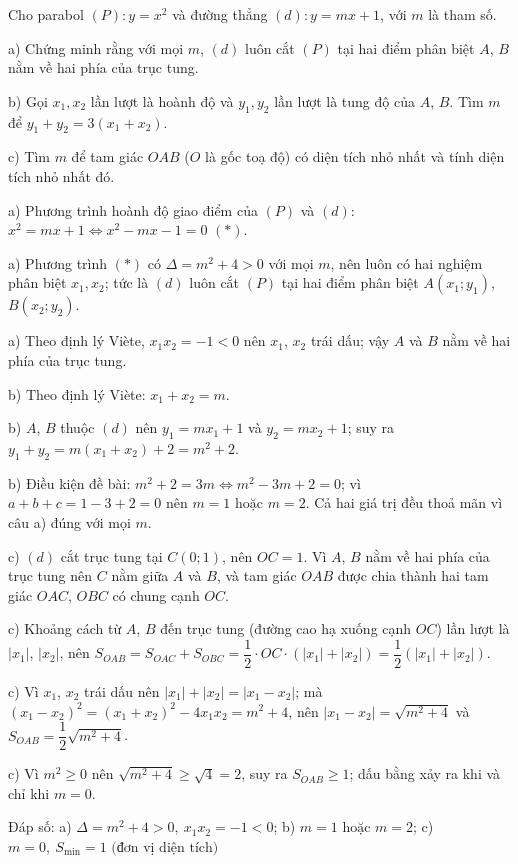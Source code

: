 \begin{problem}[9DS-HSB2-009]
Cho parabol $(P)\colon y = x^2$ và đường thẳng $(d)\colon y = mx + 1$, với $m$ là tham số.

a) Chứng minh rằng với mọi $m$, $(d)$ luôn cắt $(P)$ tại hai điểm phân biệt $A$, $B$ nằm về hai phía của trục tung.

b) Gọi $x_1, x_2$ lần lượt là hoành độ và $y_1, y_2$ lần lượt là tung độ của $A$, $B$. Tìm $m$ để $y_1 + y_2 = 3(x_1 + x_2)$.

c) Tìm $m$ để tam giác $OAB$ ($O$ là gốc toạ độ) có diện tích nhỏ nhất và tính diện tích nhỏ nhất đó.

\begin{solution}
a) Phương trình hoành độ giao điểm của $(P)$ và $(d)$: $x^2 = mx + 1 \Leftrightarrow x^2 - mx - 1 = 0$ $(*)$.

a) Phương trình $(*)$ có $\Delta = m^2 + 4 > 0$ với mọi $m$, nên luôn có hai nghiệm phân biệt $x_1, x_2$; tức là $(d)$ luôn cắt $(P)$ tại hai điểm phân biệt $A(x_1; y_1)$, $B(x_2; y_2)$.

a) Theo định lý Viète, $x_1 x_2 = -1 < 0$ nên $x_1$, $x_2$ trái dấu; vậy $A$ và $B$ nằm về hai phía của trục tung.

b) Theo định lý Viète: $x_1 + x_2 = m$.

b) $A$, $B$ thuộc $(d)$ nên $y_1 = mx_1 + 1$ và $y_2 = mx_2 + 1$; suy ra $y_1 + y_2 = m(x_1 + x_2) + 2 = m^2 + 2$.

b) Điều kiện đề bài: $m^2 + 2 = 3m \Leftrightarrow m^2 - 3m + 2 = 0$; vì $a + b + c = 1 - 3 + 2 = 0$ nên $m = 1$ hoặc $m = 2$. Cả hai giá trị đều thoả mãn vì câu a) đúng với mọi $m$.

c) $(d)$ cắt trục tung tại $C(0; 1)$, nên $OC = 1$. Vì $A$, $B$ nằm về hai phía của trục tung nên $C$ nằm giữa $A$ và $B$, và tam giác $OAB$ được chia thành hai tam giác $OAC$, $OBC$ có chung cạnh $OC$.

c) Khoảng cách từ $A$, $B$ đến trục tung (đường cao hạ xuống cạnh $OC$) lần lượt là $|x_1|$, $|x_2|$, nên $S_{OAB} = S_{OAC} + S_{OBC} = \dfrac{1}{2} \cdot OC \cdot (|x_1| + |x_2|) = \dfrac{1}{2}(|x_1| + |x_2|)$.

c) Vì $x_1$, $x_2$ trái dấu nên $|x_1| + |x_2| = |x_1 - x_2|$; mà $(x_1 - x_2)^2 = (x_1 + x_2)^2 - 4x_1x_2 = m^2 + 4$, nên $|x_1 - x_2| = \sqrt{m^2 + 4}$ và $S_{OAB} = \dfrac{1}{2}\sqrt{m^2 + 4}$.

c) Vì $m^2 \geq 0$ nên $\sqrt{m^2 + 4} \geq \sqrt{4} = 2$, suy ra $S_{OAB} \geq 1$; dấu bằng xảy ra khi và chỉ khi $m = 0$.

Đáp số: a) $\boxed{\Delta = m^2 + 4 > 0,\ x_1 x_2 = -1 < 0}$; b) $\boxed{m = 1 \text{ hoặc } m = 2}$; c) $\boxed{m = 0,\ S_{\min} = 1 \text{ (đơn vị diện tích)}}$
\end{solution}
\end{problem}

